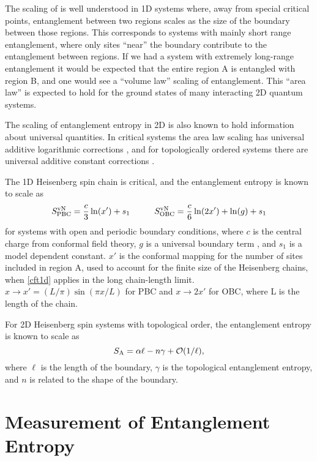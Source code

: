 The scaling of \vn is well understood in 1D systems \cite{ALreview} where, away from special critical points, entanglement between two regions scales as the size of the boundary between those regions.
This corresponds to systems with mainly short range entanglement, where only sites ``near'' the boundary contribute to the entanglement between regions.  
If we had a system with extremely long-range entanglement it would be expected that the entire region A is entangled with region B, and one would see a ``volume law'' scaling of entanglement. 
This ``area law'' \cite{Shredder} is expected to hold for the ground states of many interacting 2D quantum systems.



The scaling of entanglement entropy in 2D is also known to hold information about universal quantities.
In critical systems the area law scaling has universal additive logarithmic corrections \cite{Casini2007,Ryu}, and for topologically ordered systems there are universal additive constant corrections \cite{KP,LW}.

The 1D Heisenberg spin chain is critical, and the entanglement entropy is known to scale as \cite{Cardy} \cite{Zhou2006}
\begin{equation} \label{cft1d} 
	S^{\text{vN}}_{\text{PBC}} = \frac{c}{3}\ln(x') + s_1
	\hspace{1cm}
	S^{\text{vN}}_{\text{OBC}} = \frac{c}{6}\ln(2x') + \ln(g)+ s_1
\end{equation}
for systems with open and periodic boundary conditions, where $c$ is the central charge from conformal field theory, $g$ is a universal boundary term \cite{AffleckAndLudwig}, and $s_1$ is a model dependent constant. $x'$ is the conformal mapping for the number of sites included in region A, used to account for the finite size of the Heisenberg chains, when \eqref{cft1d} applies in the long chain-length limit.  $x \rightarrow x' = (L/\pi)\sin(\pi x/L)$ for PBC and $x \rightarrow 2x'$ for OBC, where L is the length of the chain.

For 2D Heisenberg spin systems with topological order, the entanglement entropy is known to scale as \cite{intro}
\begin{equation} \label{AL}
S_{\rm A} = \alpha \ell - n \gamma + \mathcal{O}(1/\ell),
\end{equation}
where $\ell$ is the length of the boundary, $\gamma$ is the topological entanglement entropy\cite{KP,LW}, and $n$ is related to the shape of the boundary.

\section{Measurement of Entanglement Entropy}

